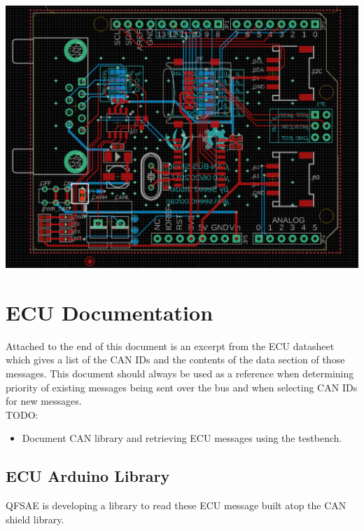 \documentclass[letterpaper]{article}
\begin{document}
\begin{center}
  \includegraphics[width=\textwidth]{terminating-resistor}
\end{center}

\section{ECU Documentation}
Attached to the end of this document is an excerpt from the ECU datasheet which
gives a list of the CAN IDs and the contents of the data section of those
messages. This document should always be used as a reference when determining
priority of existing messages being sent over the bus and when selecting CAN IDs
for new messages.\\

TODO:
\begin{itemize}
  \item Document CAN library and retrieving ECU messages using the testbench.
\end{itemize}



\subsection{ECU Arduino Library}
QFSAE is developing a library to read these ECU message built atop the
CAN shield library.
\end{document}
